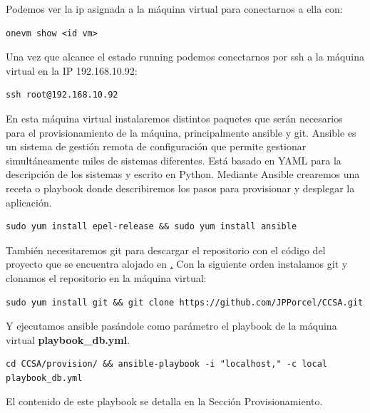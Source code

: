 Podemos ver la ip asignada a la máquina virtual para conectarnos a ella con: \\

\begin{lstlisting}
onevm show <id vm>
\end{lstlisting}

Una vez que alcance el estado running podemos conectarnos por ssh a la máquina virtual en la IP 192.168.10.92: \\

\begin{lstlisting}
ssh root@192.168.10.92
\end{lstlisting}

En esta máquina virtual instalaremos distintos paquetes que serán necesarios para el provisionamiento de la máquina, principalmente ansible y git. Ansible es un sistema de gestión remota de configuración que permite gestionar simultáneamente miles de sistemas diferentes. Está basado en YAML para la descripción de los sistemas y escrito en Python. Mediante Ansible crearemos una receta o playbook donde describiremos los pasos para provisionar y desplegar la aplicación. \\

\begin{lstlisting}
sudo yum install epel-release && sudo yum install ansible
\end{lstlisting}

También necesitaremos git para descargar el repositorio con el código del proyecto que se encuentra alojado en \href{https://github.com/JPPorcel/CCSA.git}. Con la siguiente orden instalamos git y clonamos el repositorio en la máquina virtual: \\

\begin{lstlisting}
sudo yum install git && git clone https://github.com/JPPorcel/CCSA.git
\end{lstlisting}

Y ejecutamos ansible pasándole como parámetro el playbook de la máquina virtual \textbf{playbook\_db.yml}. \\

\begin{lstlisting}
cd CCSA/provision/ && ansible-playbook -i "localhost," -c local playbook_db.yml
\end{lstlisting}

El contenido de este playbook se detalla en la Sección Provisionamiento. \\

